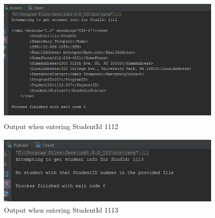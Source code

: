 \documentclass [a4paper,12pt,oneside,final]{book}
\begin{document}
	\setlength{\voffset}{0.75in}

	\begin{figure}[htp]
		\includegraphics[height=65mm]{1112}
		\caption{Output when entering StudentId 1112}
		\label{fig:1112}
	\end{figure}

	\setlength{\voffset}{0.75in}

	\begin{figure}[H]
		\includegraphics[height=35mm]{1113}
		\caption{Output when entering StudentId 1113}
		\label{fig:1113}
	\end{figure}
	
	
\end{document}
